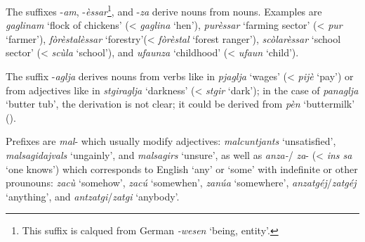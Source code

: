 The suffixes -\textit{am}, -\textit{èssar}\footnote{This suffix is calqued from German \textit{-wesen} `being, entity'.}, and -\textit{za} derive nouns from nouns. Examples are \textit{gaglinam} `flock of chickens' (< \textit{gaglina} `hen'), \textit{purèssar} `farming sector' (< \textit{pur} `farmer'), \textit{fòrèstalèssar} `forestry'(< \textit{fòrèstal} `forest ranger'), \textit{scòlarèssar} `school sector' (< \textit{scùla} `school'), and \textit{ufaunza} `childhood' (< \textit{ufaun} `child'). 

The suffix -\textit{aglja} derives nouns from verbs like in \textit{pjaglja} `wages' (< \textit{pijè} `pay') or from adjectives like in \textit{stgiraglja} `darkness' (< \textit{stgir} `dark'); in the case of \textit{panaglja} `butter tub', the derivation is not clear; it could be derived from \textit{pèn} `buttermilk' (\citet[777]{Decurtins2012}).

Prefixes are \textit{mal}- which usually modify adjectives: \textit{malcuntjants} `unsatisfied', \textit{malsagidajvals} `ungainly', and \textit{malsagirs} `unsure', as well as \textit{anza-}/ \textit{za}- (< \textit{ins sa} `one knows') which corresponds to English `any' or `some' with indefinite or other prounouns: \textit{zacù} `somehow', \textit{zacú} `somewhen', \textit{zanúa} `somewhere', \textit{anzatgéj}/\textit{zatgéj} `anything', and \textit{antzatgi}/\textit{zatgi} `anybody'.

